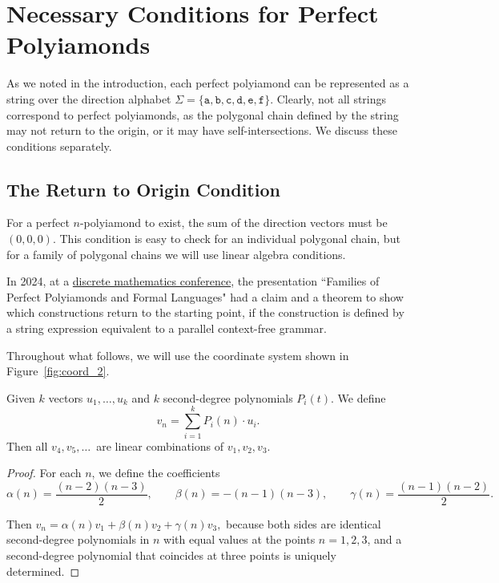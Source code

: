 \documentclass[utf8]{bjmc}
\begin{document}
\section{Necessary Conditions for Perfect Polyiamonds}

As we noted in the introduction, each perfect polyiamond can be represented as a string over the direction alphabet 
$\Sigma = \{ \mathtt{a}, \mathtt{b}, \mathtt{c}, \mathtt{d}, \mathtt{e}, \mathtt{f} \}$. 
Clearly, not all strings correspond to perfect polyiamonds, as the polygonal chain defined by the string
may not return to the origin, or it may have self-intersections. We discuss these conditions separately. 

\subsection{The Return to Origin Condition}


For a perfect $n$-polyiamond to exist, the sum of the direction vectors must be $(0,0,0)$. 
This condition is easy to check for an individual polygonal chain, but for a family of polygonal chains we 
will use linear algebra conditions. 

In 2024, at a
\href{https://conferences.lu.lv/event/493/contributions/2217/}{discrete
mathematics conference}, the presentation ``Families of Perfect Polyiamonds
and Formal Languages" had a claim and a theorem to show which constructions 
return to the starting point, if the construction is defined by a string expression 
equivalent to a parallel context-free grammar. 

Throughout what follows, we will use the coordinate system shown in
Figure~\ref{fig:coord_2}.

\begin{claim}\label{ap:1}

Given $k$ vectors $u_1,  \dots, u_k$ and $k$ second-degree polynomials
$P_i(t)$. We define
\[
v_n=\sum_{i=1}^k P_i(n)\cdot u_i.
\]
Then all $v_4, v_5, \dots $\ are linear combinations of $v_1, v_2, v_3$.
\end{claim}



\begin{proof}
For each $n$, we define the coefficients
\[
\alpha(n)=\frac{(n-2)(n-3)}{2}, \qquad
\beta(n)=-(n-1)(n-3), \qquad
\gamma(n)=\frac{(n-1)(n-2)}{2}.
\]

Then $
v_n=\alpha(n)v_1+\beta(n)v_2+\gamma(n)v_3,
$
because both sides are identical second-degree polynomials in $n$ with equal
values at the points $n=1,2,3$, and a second-degree polynomial that coincides
at three points is uniquely determined.

\end{proof}
\end{document}
